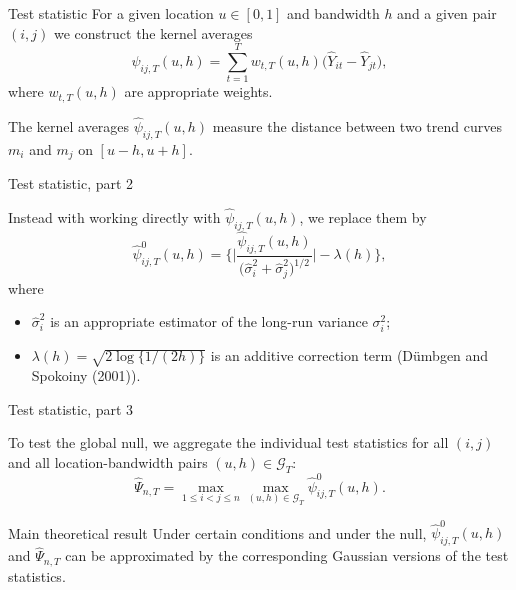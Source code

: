 \documentclass[10pt, handout]{beamer}
\begin{document}
\begin{frame}{Test statistic}
For a given location $u \in [0,1]$ and bandwidth $h$ and a given pair $(i, j)$ we construct the kernel averages
\begin{equation*}
\widehat{\psi}_{ij, T}(u,h) = \sum\limits_{t=1}^T w_{t,T}(u,h) \big(\widehat{Y}_{it} - \widehat{Y}_{jt}), 
\end{equation*}
\vspace{-3mm}
where $w_{t,T}(u,h)$ are appropriate weights.\pause

\vspace{3mm}
The kernel averages $\widehat{\psi}_{ij, T}(u,h)$ measure the distance between two trend curves $m_i$ and $m_j$ on $[u - h, u + h]$.

\end{frame}
\begin{frame}{Test statistic, part 2}

Instead with working directly with $\widehat{\psi}_{ij, T}(u,h)$, we replace them by
\begin{equation*}
\widehat{\psi}^0_{ij, T}(u,h) = \bigg\{ \bigg|\frac{\widehat{\psi}_{ij, T}(u,h)}{\big(\widehat{\sigma}_i^2 + \widehat{\sigma}_j^2\big)^{1/2}}\bigg| - \lambda(h) \bigg\}, 
\end{equation*}\pause
\vspace{-3mm}
where 
\begin{itemize}
\item $\widehat{\sigma}_i^2$ is an appropriate estimator of the long-run variance $\sigma^2_i$;\pause
\item $\lambda(h) = \sqrt{2 \log \{ 1/(2h) \}}$ is an additive correction term (D{\"u}mbgen and Spokoiny (2001)). %
\end{itemize}
\end{frame}

\begin{frame}{Test statistic, part 3}

To test the global null, we aggregate the individual test statistics \linebreak for all $(i, j)$ and all location-bandwidth pairs $(u, h) \in \mathcal{G}_T$:
\begin{equation*}
\widehat{\Psi}_{n, T} = \max_{1 \leq i < j \leq n} \max_{(u,h) \in \mathcal{G}_T} \widehat{\psi}^0_{ij, T}(u,h). 
\end{equation*}\pause
\vspace{-3mm}
\begin{block}{Main theoretical result}
Under certain conditions and under the null, $\widehat{\psi}^0_{ij, T}(u,h)$ and $\widehat{\Psi}_{n, T}$ can be approximated by the corresponding Gaussian versions of the test statistics.
\end{block}
\end{frame}
\end{document}
